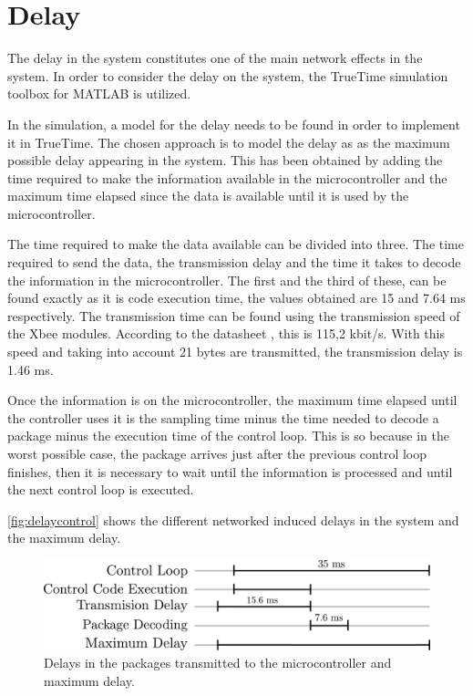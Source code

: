 \section{Delay}
The delay in the system constitutes one of the main network effects in the system. In order to consider the delay on the system, the TrueTime simulation toolbox for MATLAB is utilized. 

In the simulation, a model for the delay needs to be found in order to implement it in TrueTime. The chosen approach is to model the delay as as the maximum possible delay appearing in the system. This has been obtained by adding the time required to make the information available in the microcontroller and the maximum time elapsed since the data is available until it is used by the microcontroller. 

The time required to make the data available can be divided into three. The time required to send the data, the transmission delay and the time it takes to decode the information in the microcontroller. The first and the third of these, can be found exactly as it is code execution time, the values obtained are 15 and 7.64 ms respectively. The transmission time can be found using the transmission speed of the Xbee modules. According to the datasheet , this is  115,2 kbit/s. With this speed and taking into account 21 bytes are transmitted, the transmission delay is 1.46 ms.

Once the information is on the microcontroller, the maximum time elapsed until the controller uses it is the sampling time minus the time needed to decode a package minus the execution time of the control loop. This is so because in the worst possible case, the package arrives just after the previous control loop finishes, then it is necessary to wait until the information is processed and until the next control loop is executed. 

\autoref{fig:delaycontrol} shows the different networked induced delays in the system and the maximum delay. 
\begin{figure}[H]
	\centering
	\includegraphics[width=.6\textwidth]{figures/maxDelay.pdf}
	\caption{Delays in the packages transmitted to the microcontroller and maximum delay.}
	\label{fig:delaycontrol}
\end{figure}

